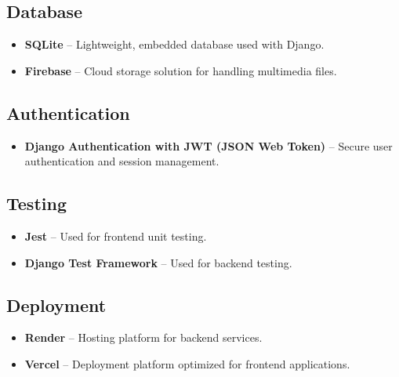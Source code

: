 \documentclass[a4paper,12pt]{article}
\begin{document}
\subsection{Database}

\begin{itemize}

    \item \textbf{SQLite} – Lightweight, embedded database used with Django.

    \item \textbf{Firebase} – Cloud storage solution for handling multimedia files.

\end{itemize}



\subsection{Authentication}

\begin{itemize}

    \item \textbf{Django Authentication with JWT (JSON Web Token)} – Secure user authentication and session management.

\end{itemize}



\subsection{Testing}

\begin{itemize}

    \item \textbf{Jest} – Used for frontend unit testing.

    \item \textbf{Django Test Framework} – Used for backend testing.

\end{itemize}



\subsection{Deployment}

\begin{itemize}

    \item \textbf{Render} – Hosting platform for backend services.

    \item \textbf{Vercel} – Deployment platform optimized for frontend applications.

\end{itemize}
\end{document}
